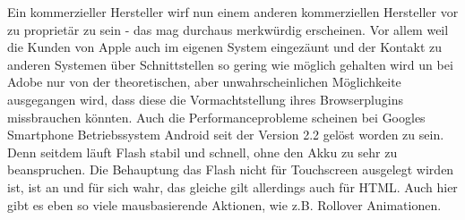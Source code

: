 Ein kommerzieller Hersteller wirf nun einem anderen kommerziellen Hersteller vor zu
proprietär zu sein - das mag durchaus merkwürdig erscheinen. Vor allem weil die 
Kunden von Apple auch im eigenen System eingezäunt und der Kontakt zu anderen 
Systemen über Schnittstellen so gering wie möglich gehalten wird un bei Adobe nur 
von der theoretischen, aber unwahrscheinlichen Möglichkeite ausgegangen wird, dass
diese die Vormachtstellung ihres Browserplugins missbrauchen könnten.
\newline\newline
Auch die Performanceprobleme scheinen bei Googles Smartphone Betriebssystem
Android seit der Version 2.2 gelöst worden zu sein. Denn seitdem läuft
Flash stabil und schnell, ohne den Akku zu sehr zu beanspruchen.
\newline\newline
Die Behauptung das Flash nicht für Touchscreen ausgelegt wirden ist, ist an und für
sich wahr, das gleiche gilt allerdings auch für HTML. Auch hier gibt es eben so viele
mausbasierende Aktionen, wie z.B. Rollover Animationen.